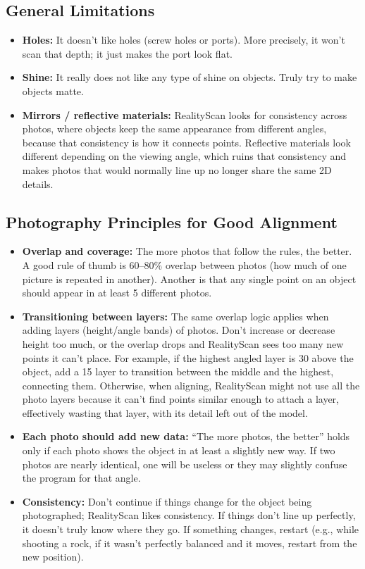 \documentclass[11pt]{article}
\begin{document}
\subsection{General Limitations}
\begin{itemize}[leftmargin=1.4em]
  \item \textbf{Holes:} It doesn't like holes (screw holes or ports). More precisely, it won't scan that depth; it just makes the port look flat.
  \item \textbf{Shine:} It really does not like any type of shine on objects. Truly try to make objects matte.
  \item \textbf{Mirrors / reflective materials:} RealityScan looks for consistency across photos, where objects keep the same appearance from different angles, because that consistency is how it connects points. Reflective materials look different depending on the viewing angle, which ruins that consistency and makes photos that would normally line up no longer share the same 2D details.
\end{itemize}

\subsection{Photography Principles for Good Alignment}
\begin{itemize}[leftmargin=1.4em]
  \item \textbf{Overlap and coverage:} The more photos that follow the rules, the better. A good rule of thumb is 60--80\% overlap between photos (how much of one picture is repeated in another). Another is that any single point on an object should appear in at least 5 different photos.
  \item \textbf{Transitioning between layers:} The same overlap logic applies when adding layers (height/angle bands) of photos. Don't increase or decrease height too much, or the overlap drops and RealityScan sees too many new points it can't place. For example, if the highest angled layer is 30\textdegree{} above the object, add a 15\textdegree{} layer to transition between the middle and the highest, connecting them. Otherwise, when aligning, RealityScan might not use all the photo layers because it can't find points similar enough to attach a layer, effectively wasting that layer, with its detail left out of the model.
  \item \textbf{Each photo should add new data:} ``The more photos, the better'' holds only if each photo shows the object in at least a slightly new way. If two photos are nearly identical, one will be useless or they may slightly confuse the program for that angle.
  \item \textbf{Consistency:} Don't continue if things change for the object being photographed; RealityScan likes consistency. If things don't line up perfectly, it doesn't truly know where they go. If something changes, restart (e.g., while shooting a rock, if it wasn't perfectly balanced and it moves, restart from the new position).
\end{itemize}
\end{document}
